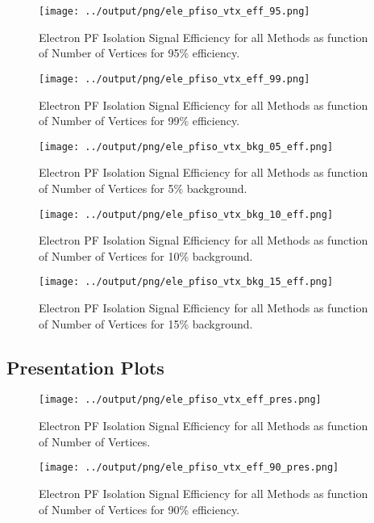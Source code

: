 \documentclass[11pt]{book}
\begin{document}
\begin{figure}[htb]
\centering
\texttt{[image: ../output/png/ele\_pfiso\_vtx\_eff\_95.png]}
\caption{Electron PF Isolation Signal Efficiency for all Methods as function of Number of Vertices for 95\% efficiency.}
\label{fig:ele_pfiso_vtx_eff_95}
\end{figure}

\begin{figure}[htb]
\centering
\texttt{[image: ../output/png/ele\_pfiso\_vtx\_eff\_99.png]}
\caption{Electron PF Isolation Signal Efficiency for all Methods as function of Number of Vertices for 99\% efficiency.}
\label{fig:ele_pfiso_vtx_eff_99}
\end{figure}

\begin{figure}[htb]
\centering
\texttt{[image: ../output/png/ele\_pfiso\_vtx\_bkg\_05\_eff.png]}
\caption{Electron PF Isolation Signal Efficiency for all Methods as function of Number of Vertices for 5\% background.}
\label{fig:ele_pfiso_vtx_bkg_05_eff}
\end{figure}

\begin{figure}[htb]
\centering
\texttt{[image: ../output/png/ele\_pfiso\_vtx\_bkg\_10\_eff.png]}
\caption{Electron PF Isolation Signal Efficiency for all Methods as function of Number of Vertices for 10\% background.}
\label{fig:ele_pfiso_vtx_bkg_10_eff}
\end{figure}

\begin{figure}[htb]
\centering
\texttt{[image: ../output/png/ele\_pfiso\_vtx\_bkg\_15\_eff.png]}
\caption{Electron PF Isolation Signal Efficiency for all Methods as function of Number of Vertices for 15\% background.}
\label{fig:ele_pfiso_vtx_bkg_15_eff}
\end{figure}
\clearpage

\subsection{Presentation Plots}
\begin{figure}[htb]
\centering
\texttt{[image: ../output/png/ele\_pfiso\_vtx\_eff\_pres.png]}
\caption{Electron PF Isolation Signal Efficiency for all Methods as function of Number of Vertices.}
\label{fig:ele_pfiso_vtx_eff_pres}
\end{figure}

\begin{figure}[htb]
\centering
\texttt{[image: ../output/png/ele\_pfiso\_vtx\_eff\_90\_pres.png]}
\caption{Electron PF Isolation Signal Efficiency for all Methods as function of Number of Vertices for 90\% efficiency.}
\label{fig:ele_pfiso_vtx_eff_90_pres}
\end{figure}
\end{document}
